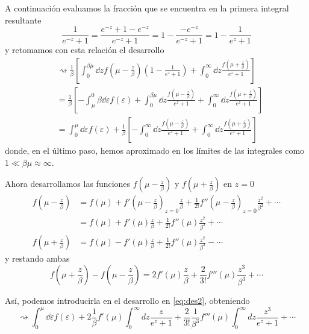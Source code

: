 A continuación evaluamos la fracción que se encuentra en la primera integral resultante
\begin{equation}
	\frac{1}{e^{-z} + 1} = \frac{e^{-z} + 1 - e^{-z}}{e^{-z} + 1} = 1 - \frac{-e^{-z}}{e^{-z} + 1} = 1 - \frac{1}{e^{z} + 1}
\end{equation}
y retomamos con esta relación el desarrollo
\begin{align}\label{eq:des2}
	&\rightsquigarrow \frac{1}{\beta} \left[  \int_{0}^{\beta\mu} \dd{z} f\left( \mu - \frac{z}{\beta}\right) \left( 1 - \frac{1}{e^{z} + 1} \right) + \int_{0}^{\infty} \dd{z} \frac{f(\mu + \frac{z}{\beta})}{e^z + 1}\right] \nonumber \\
	&= \frac{1}{\beta} \left[ - \int_{\mu}^{0} \beta \dd{\varepsilon} f(\varepsilon) +  \int_{0}^{\beta\mu} \dd{z} \frac{f\left( \mu - \frac{z}{\beta}\right)}{e^{z} + 1} + \int_{0}^{\infty} \dd{z} \frac{f(\mu + \frac{z}{\beta})}{e^z + 1}\right]\\
	&= \int_{0}^{\mu} \dd{\varepsilon} f(\varepsilon) + \frac{1}{\beta} \left[ -\int_{0}^{\infty} \dd{z} \frac{f\left( \mu - \frac{z}{\beta}\right)}{e^z + 1} + \int_{0}^{\infty} \dd{z} \frac{f\left( \mu + \frac{z}{\beta}\right)}{e^z + 1} \right] \nonumber
\end{align}
donde, en el último paso, hemos aproximado en los límites de las integrales como $1 \ll \beta\mu \approx \infty$.

Ahora desarrollamos las funciones $f\left( \mu - \frac{z}{\beta}\right)$ y $f\left( \mu + \frac{z}{\beta}\right)$ en $z=0$
\begin{align}
	f\left( \mu - \frac{z}{\beta}\right) &= f(\mu) + f'\left( \mu - \frac{z}{\beta}\right)_{z=0}\frac{z}{\beta} + \frac{1}{2!}f''\left( \mu - \frac{z}{\beta}\right)_{z=0}\frac{z^2}{\beta^2} + \cdots \nonumber \\
	&= f(\mu) + f'(\mu)\frac{z}{\beta} + \frac{1}{2!}f''(\mu)\frac{z^2}{\beta^2} + \cdots\\
	f\left( \mu + \frac{z}{\beta}\right) &= f(\mu) - f'(\mu)\frac{z}{\beta} + \frac{1}{2!}f''(\mu)\frac{z^2}{\beta^2} - \cdots
\end{align}
y restando ambas
\begin{equation}
	 f\left( \mu + \frac{z}{\beta}\right) - f\left( \mu - \frac{z}{\beta}\right) = 2f'(\mu)\frac{z}{\beta} + \frac{2}{3!}f'''(\mu)\frac{z^3}{\beta^3} + \cdots
\end{equation}

Así, podemos introducirla en el desarrollo en \eqref{eq:des2}, obteniendo
\begin{equation}\label{eq:des3}
	\rightsquigarrow \int_{0}^{\mu} \dd{\varepsilon} f(\varepsilon) + 2\frac{1}{\beta}f'(\mu) \int_{0}^{\infty} dz \frac{z}{e^z + 1} + \frac{2}{3!}\frac{1}{\beta^3}f'''(\mu) \int_{0}^{\infty} dz \frac{z^3}{e^z + 1} + \cdots
\end{equation}


